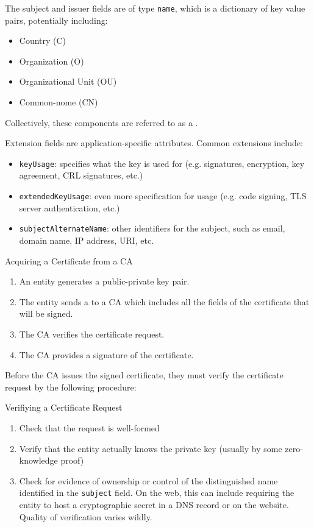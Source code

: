 The subject and issuer fields are of type \texttt{name}, which is a dictionary of key value pairs, potentially including:
\begin{itemize}[noitemsep]
    \item Country (C)
    \item Organization (O)
    \item Organizational Unit (OU)
    \item Common-nome (CN)
\end{itemize}
Collectively, these components are referred to as a .

Extension fields are application-specific attributes. Common extensions include:
\begin{itemize}
    \item \texttt{keyUsage}: specifies what the key is used for (e.g. signatures, encryption, key agreement, CRL signatures, etc.)
    \item \texttt{extendedKeyUsage}: even more specification for usage (e.g. code signing, TLS server authentication, etc.)
    \item \texttt{subjectAlternateName}: other identifiers for the subject, such as email, domain name, IP address, URI, etc.
\end{itemize}

\begin{tecbox}{Acquiring a Certificate from a CA}{}
    \begin{enumerate}
        \item An entity generates a public-private key pair.
        \item The entity sends a  to a CA which includes all the fields of the certificate that will be signed.
        \item The CA verifies the certificate request.
        \item The CA provides a signature of the certificate.
    \end{enumerate}
\end{tecbox}

Before the CA issues the signed certificate, they must verify the certificate request by the following procedure:

\begin{tecbox}{Verifiying a Certificate Request}{}
    \begin{enumerate}
        \item Check that the request is well-formed
        \item Verify that the entity actually knows the private key (usually by some zero-knowledge proof)
        \item Check for evidence of ownership or control of the distinguished name identified in the \texttt{subject} field. On the web, this can include requiring the entity to host a cryptographic secret in a DNS record or on the website. Quality of verification varies wildly.
    \end{enumerate}
\end{tecbox}

